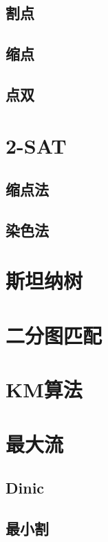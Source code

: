 \documentclass{probook}
\begin{document}
\subsection{割点}

\subsection{缩点}

\subsection{点双}

\section{2-SAT}
\subsection{缩点法}

\subsection{染色法}

\section{斯坦纳树}

\section{二分图匹配}

\section{KM算法}

\section{最大流}
\subsection{Dinic}

\subsection{最小割}

\end{document}
